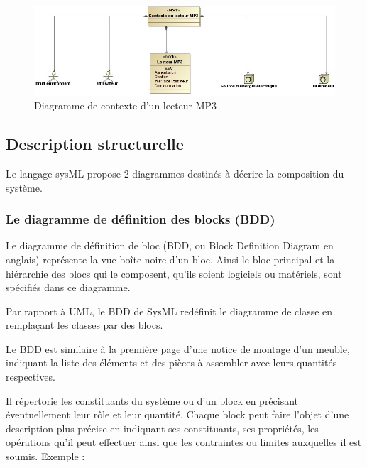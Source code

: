 \documentclass[12pt,a4paper]{report}
\begin{document}
\begin{figure}[H]
	\centering
	\includegraphics[width=0.8\linewidth]{image11.png}
	\caption{Diagramme de contexte d'un lecteur MP3}
	
\end{figure}

\noindent \begin{flushleft}
	
\end{flushleft}


\subsection{ Description structurelle}

\noindent \begin{flushleft}
	Le langage sysML propose 2 diagrammes destin\'{e}s \`{a} d\'{e}crire la composition du syst\`{e}me.
\end{flushleft}


\subsubsection{ Le diagramme de d\'{e}finition des blocks (BDD)}

\noindent \begin{flushleft}
	Le diagramme de d\'{e}finition de bloc (BDD, ou Block Definition Diagram en anglais) repr\'{e}sente la vue bo\^{i}te noire d'un bloc. Ainsi le bloc principal et la hi\'{e}rarchie des blocs qui le composent, qu'ils soient logiciels ou mat\'{e}riels, sont sp\'{e}cifi\'{e}s dans ce diagramme.
	
	\noindent Par rapport \`{a} UML, le BDD de SysML red\'{e}finit le diagramme de classe en rempla\c{c}ant les classes par des blocs.
	
	\noindent Le BDD est similaire \`{a} la premi\`{e}re page d'une notice de montage d'un meuble, indiquant la liste des \'{e}l\'{e}ments et des pi\`{e}ces \`{a} assembler avec leurs quantit\'{e}s respectives.
	
	\noindent Il r\'{e}pertorie les constituants du syst\`{e}me ou d'un block en pr\'{e}cisant \'{e}ventuellement leur r\^{o}le et leur quantit\'{e}. Chaque block peut faire l'objet d'une description plus pr\'{e}cise en indiquant ses constituants, ses propri\'{e}t\'{e}s, les op\'{e}rations qu'il peut effectuer ainsi que les contraintes ou limites auxquelles il est soumis. Exemple : 
	
	\noindent 
\end{flushleft}
\end{document}
